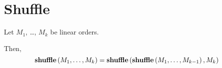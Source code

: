 \section{Shuffle}

\begin{lemma}
    Let $M_1$, \ldots, $M_k$ be linear orders.

    Then, \[
        \mathbf{shuffle} \left( {M_1, \ldots, M_k} \right) = \mathbf{shuffle} \left( {\mathbf{shuffle} \left( {M_1, \ldots, M_{k-1}} \right), M_k} \right)
    \]
\end{lemma}
